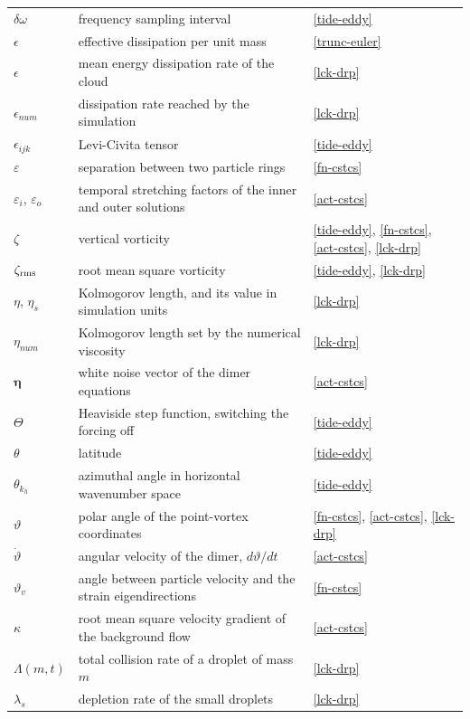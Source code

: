 \begin{longtable}{@{}p{}p{}p{}@{}}
$\delta\omega$ & frequency sampling interval & \ref{tide-eddy} \\
\addlinespace
$\epsilon$ & effective dissipation per unit mass & \ref{trunc-euler} \\
$\epsilon$ & mean energy dissipation rate of the cloud & \ref{lck-drp} \\
$\epsilon_{num}$ & dissipation rate reached by the simulation & \ref{lck-drp} \\
$\epsilon_{ijk}$ & Levi-Civita tensor & \ref{tide-eddy} \\
$\varepsilon$ & separation between two particle rings & \ref{fn-cstcs} \\
$\varepsilon_i$, $\varepsilon_o$ & temporal stretching factors of the inner and outer solutions & \ref{act-cstcs} \\
\addlinespace
$\zeta$ & vertical vorticity & \ref{tide-eddy}, \ref{fn-cstcs}, \ref{act-cstcs}, \ref{lck-drp} \\
$\zeta_{\rm rms}$ & root mean square vorticity & \ref{tide-eddy}, \ref{lck-drp} \\
\addlinespace
$\eta$, $\eta_s$ & Kolmogorov length, and its value in simulation units & \ref{lck-drp} \\
$\eta_{num}$ & Kolmogorov length set by the numerical viscosity & \ref{lck-drp} \\
$\boldsymbol{\eta}$ & white noise vector of the dimer equations & \ref{act-cstcs} \\
\addlinespace
$\Theta$ & Heaviside step function, switching the forcing off & \ref{tide-eddy} \\
$\theta$ & latitude & \ref{tide-eddy} \\
$\theta_{k_h}$ & azimuthal angle in horizontal wavenumber space & \ref{tide-eddy} \\
$\vartheta$ & polar angle of the point-vortex coordinates & \ref{fn-cstcs}, \ref{act-cstcs}, \ref{lck-drp} \\
$\dot{\vartheta}$ & angular velocity of the dimer, $d\vartheta/dt$ & \ref{act-cstcs} \\
$\vartheta_v$ & angle between particle velocity and the strain eigendirections & \ref{fn-cstcs} \\
\addlinespace
$\kappa$ & root mean square velocity gradient of the background flow & \ref{act-cstcs} \\
\addlinespace
$\varLambda(m,t)$ & total collision rate of a droplet of mass $m$ & \ref{lck-drp} \\
$\lambda_s$ & depletion rate of the small droplets & \ref{lck-drp} \\

\end{longtable}
